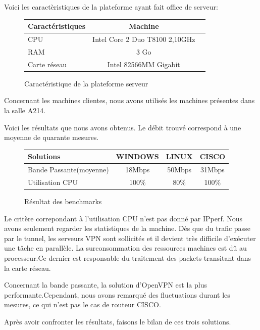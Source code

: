 Voici les caractèristiques de la plateforme ayant fait office de serveur:

\begin{figure}[H]
	\begin{center}
\begin{tabular}{|l|c|c|}
\hline
Caractéristiques & Machine \\
\hline
CPU & Intel Core 2 Duo T8100 2,10GHz \\
RAM & 3 Go \\
Carte réseau & Intel 82566MM Gigabit \\
\hline
\end{tabular}
	\end{center}
	\caption{Caractéristique de la plateforme serveur}
	\label{Caractéristique_de_la_plateforme_serveur}
\end{figure}

Concernant les machines clientes, nous avons utilisés les machines présentes dans la salle A214.

Voici les résultats que nous avons obtenus. Le débit trouvé correspond à une moyenne de quarante mesures.

\begin{figure}[H]
	\begin{center}
\begin{tabular}{|l|c|c|c|}
\hline
Solutions & WINDOWS & LINUX & CISCO \\
\hline
Bande Passante(moyenne) & 18Mbps & 50Mbps & 31Mbps \\
Utilisation CPU & 100\% & 80\% & 100\% \\
\hline
\end{tabular}
	\end{center}
	\caption{Résultat des benchmarks}
	\label{Résultat_des_benchmarks}
\end{figure}

Le critère correpondant à l'utilisation CPU n'est pas donné par IPperf. Nous avons seulement regarder les statistiques de la machine. Dès que du trafic passe par le tunnel, les serveurs VPN sont sollicités et il devient très difficile d'exécuter une tâche en parallèle. La surconsommation des ressources machines est dû au processeur.Ce dernier est responsable du traitement des packets transitant dans la carte réseau.

Concernant la bande passante, la solution d'OpenVPN est la plus performante.Cependant, nous avons remarqué des fluctuations durant les mesures, ce qui n'est pas le cas de routeur CISCO.

Après avoir confronter les résultats, faisons le bilan de ces trois solutions.

